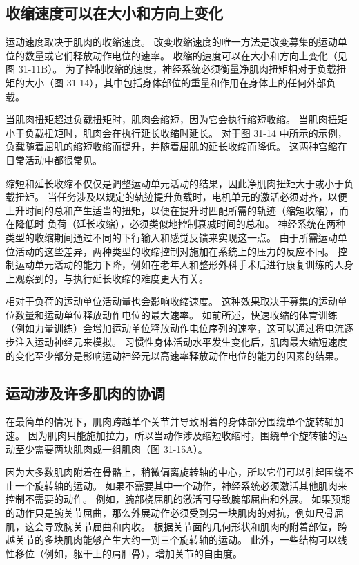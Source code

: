 \subsection{收缩速度可以在大小和方向上变化}
运动速度取决于肌肉的收缩速度。 改变收缩速度的唯一方法是改变募集的运动单位的数量或它们释放动作电位的速率。 收缩的速度可以在大小和方向上变化（见图 31-11B）。 为了控制收缩的速度，神经系统必须衡量净肌肉扭矩相对于负载扭矩的大小（图 31-14），其中包括身体部位的重量和作用在身体上的任何外部负载。

当肌肉扭矩超过负载扭矩时，肌肉会缩短，因为它会执行缩短收缩。 当肌肉扭矩小于负载扭矩时，肌肉会在执行延长收缩时延长。 对于图 31-14 中所示的示例，负载随着屈肌的缩短收缩而提升，并随着屈肌的延长收缩而降低。 这两种宫缩在日常活动中都很常见。

缩短和延长收缩不仅仅是调整运动单元活动的结果，因此净肌肉扭矩大于或小于负载扭矩。 当任务涉及以规定的轨迹提升负载时，电机单元的激活必须对齐，以便上升时间的总和产生适当的扭矩，以便在提升时匹配所需的轨迹（缩短收缩），而在降低时 负荷（延长收缩），必须类似地控制衰减时间的总和。 神经系统在两种类型的收缩期间通过不同的下行输入和感觉反馈来实现这一点。 由于所需运动单位活动的这些差异，两种类型的收缩控制对施加在系统上的压力的反应不同。 控制运动单元活动的能力下降，例如在老年人和整形外科手术后进行康复训练的人身上观察到的，与执行延长收缩的难度更大有关。

相对于负荷的运动单位活动量也会影响收缩速度。 这种效果取决于募集的运动单位数量和运动单位释放动作电位的最大速率。 如前所述，快速收缩的体育训练（例如力量训练）会增加运动单位释放动作电位序列的速率，这可以通过将电流逐步注入运动神经元来模拟。 习惯性身体活动水平发生变化后，肌肉最大缩短速度的变化至少部分是影响运动神经元以高速率释放动作电位的能力的因素的结果。

\subsection{运动涉及许多肌肉的协调}
在最简单的情况下，肌肉跨越单个关节并导致附着的身体部分围绕单个旋转轴加速。 因为肌肉只能施加拉力，所以当动作涉及缩短收缩时，围绕单个旋转轴的运动至少需要两块肌肉或一组肌肉（图 31-15A）。

因为大多数肌肉附着在骨骼上，稍微偏离旋转轴的中心，所以它们可以引起围绕不止一个旋转轴的运动。 如果不需要其中一个动作，神经系统必须激活其他肌肉来控制不需要的动作。 例如，腕部桡屈肌的激活可导致腕部屈曲和外展。 如果预期的动作只是腕关节屈曲，那么外展动作必须受到另一块肌肉的对抗，例如尺骨屈肌，这会导致腕关节屈曲和内收。 根据关节面的几何形状和肌肉的附着部位，跨越关节的多块肌肉能够产生大约一到三个旋转轴的运动。 此外，一些结构可以线性移位（例如，躯干上的肩胛骨），增加关节的自由度。

